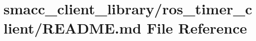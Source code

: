 \hypertarget{smacc__client__library_2ros__timer__client_2README_8md}{}\section{smacc\+\_\+client\+\_\+library/ros\+\_\+timer\+\_\+client/\+R\+E\+A\+D\+ME.md File Reference}
\label{smacc__client__library_2ros__timer__client_2README_8md}
